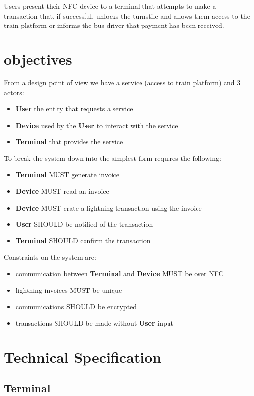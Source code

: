 \documentclass[a4paper]{article}
\newcommand{\terminal}{\textbf{\color{cornellred} Terminal }}
\newcommand{\device}{\textbf{ \color{airforceblue} Device }}
\newcommand{\user}{\textbf{\color{gray} User }}
\begin{document}
Users present their NFC device to a terminal that attempts to make a transaction
that, if successful, unlocks the turnstile and allows them access to the
train platform or informs the bus driver that payment has been received.\\

\section{objectives}
From a design point of view we have a service (access to train platform) and 3
actors:
\begin{itemize}
    \item \user the entity that requests a service
    \item \device used by the \user to interact with the service
    \item \terminal that provides the service
\end{itemize}

To break the system down into the simplest form requires the following:
\begin{itemize}
	\item \terminal MUST generate invoice
	\item \device MUST read an invoice
	\item \device MUST crate a lightning transaction using the invoice
	\item \user SHOULD be notified of the transaction
	\item \terminal SHOULD confirm the transaction
\end{itemize}

Constraints on the system are:
\begin{itemize}
    \item communication between \terminal and \device MUST be over NFC
    \item lightning invoices MUST be unique
	\item communications SHOULD be encrypted
	\item transactions SHOULD be made without \user input
\end{itemize}

\section{Technical Specification}

\subsection{\terminal}
\end{document}
